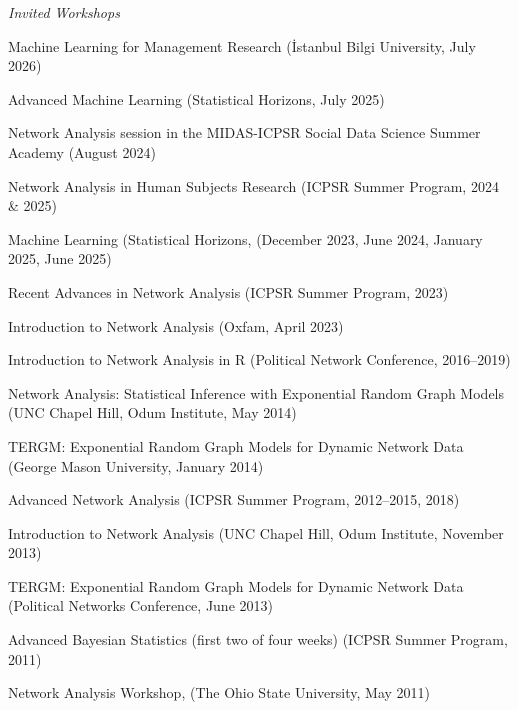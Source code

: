 \documentclass[overlapped,line]{res}
\begin{document}
\begin{resume}
\hspace{-1cm} \emph{Invited Workshops} 
\begin{etaremune}
\item Machine Learning for Management Research (İstanbul Bilgi University, July 2026)
\item Advanced Machine Learning (Statistical Horizons, July 2025)
\item Network Analysis session in the MIDAS-ICPSR Social Data Science Summer Academy (August 2024)
\item Network Analysis in Human Subjects Research (ICPSR Summer Program, 2024 \& 2025)
\item Machine Learning (Statistical Horizons, (December 2023, June 2024, January 2025, June 2025)
\item Recent Advances in Network Analysis (ICPSR Summer Program, 2023)
\item Introduction to Network Analysis (Oxfam, April 2023)
\item Introduction to Network Analysis in R (Political Network Conference, 2016--2019)
\item Network Analysis: Statistical Inference with Exponential Random Graph Models (UNC Chapel Hill, Odum Institute, May 2014)
\item TERGM: Exponential Random Graph Models for Dynamic Network Data (George Mason University, January 2014)
\item Advanced Network Analysis (ICPSR Summer Program, 2012--2015, 2018)
\item Introduction to Network Analysis (UNC Chapel Hill, Odum Institute, November 2013)
\item TERGM: Exponential Random Graph Models for Dynamic Network Data (Political Networks Conference, June 2013)
\item Advanced Bayesian Statistics (first two of four weeks) (ICPSR Summer Program, 2011)
\item Network Analysis Workshop, (The Ohio State University, May 2011)
\end{etaremune}


\end{resume}
\end{document}
